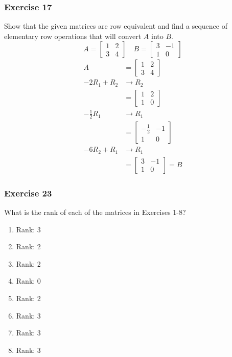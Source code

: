 \documentclass{math}
\begin{document}
\subsubsection*{Exercise 17}
Show that the given matrices are row equivalent and find a sequence of
elementary row operations that will convert \( A \) into \( B \).
\[ A = \begin{bmatrix}
  1 & 2 \\
  3 & 4
\end{bmatrix}\quad B = \begin{bmatrix}
  3 & -1 \\
  1 & 0
\end{bmatrix} \]
\begin{align*}
  A &= \begin{bmatrix}
    1 & 2 \\
    3 & 4
  \end{bmatrix} \\
  -2R_1+R_2 &\to R_2 \\
  &= \begin{bmatrix}
    1 & 2 \\
    1 & 0
  \end{bmatrix} \\
  -\frac{1}{2}R_1 &\to R_1 \\
  &= \begin{bmatrix}
    -\frac{1}{2} & -1 \\
    1 & 0
  \end{bmatrix} \\
  -6R_2+R_1 &\to R_1 \\
  &= \begin{bmatrix}
    3 & -1 \\
    1 & 0
  \end{bmatrix} = B
\end{align*}

\subsubsection*{Exercise 23}
What is the rank of each of the matrices in Exercises 1-8?
\begin{enumerate}
  \item Rank: 3
  \item Rank: 2
  \item Rank: 2
  \item Rank: 0
  \item Rank: 2
  \item Rank: 3
  \item Rank: 3
  \item Rank: 3
\end{enumerate}
\end{document}

